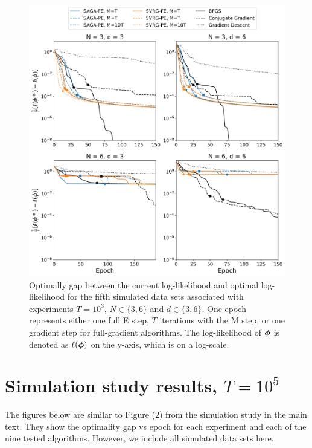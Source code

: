 \documentclass[12pt]{article}
\begin{document}
\begin{figure}[H]
    \centering
    \includegraphics[width=6.5in]{../plt/log-like_v_epoch_T-1000-004.png}
    \caption{Optimally gap between the current log-likelihood and optimal log-likelihood for the fifth simulated data sets associated with experiments $T=10^{3}$, $N \in \{3,6\}$ and $d \in \{3,6\}$. One epoch represents either one full E step, $T$ iterations with the M step, or one gradient step for full-gradient algorithms. The log-likelihood of $\boldsymbol{\phi}$ is denoted as $\ell(\boldsymbol{\phi})$ on the y-axis, which is on a log-scale.}
\end{figure}

\newpage

\section{Simulation study results, $T = 10^{5}$}

The figures below are similar to Figure (2) from the simulation study in the main text. They show the optimality gap vs epoch for each experiment and each of the nine tested algorithms. However, we include all simulated data sets here.
\end{document}
